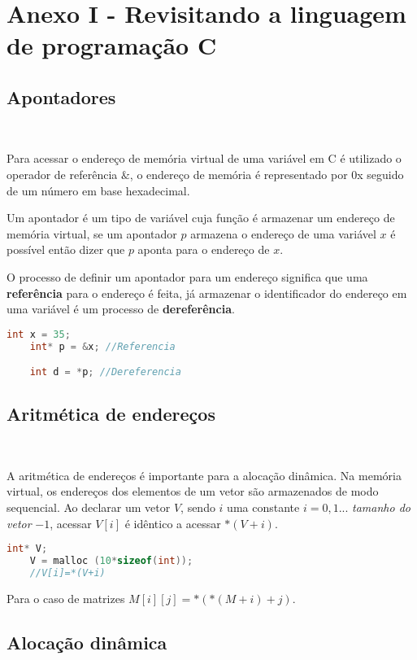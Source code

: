 \section*{Anexo I - Revisitando a linguagem de programação C}
\subsection*{Apontadores}
\

Para acessar o endereço de memória virtual de uma variável em C é utilizado o operador de referência $\&$, o endereço de memória é representado por 0x seguido de um número em base hexadecimal.

Um apontador é um tipo de variável cuja função é armazenar um endereço de memória virtual, se um apontador $p$ armazena o endereço de uma variável $x$ é possível então dizer que $p$ aponta para o endereço de $x$.

O processo de definir um apontador para um endereço significa que uma \textbf{referência} para o endereço é feita, já armazenar o identificador do endereço em uma variável é um processo de \textbf{dereferência}.

\begin{lstlisting}[language=C, frame=single]
    int x = 35;
    int* p = &x; //Referencia

    int d = *p; //Dereferencia
\end{lstlisting}

\subsection*{Aritmética de endereços}
\

A aritmética de endereços é importante para a alocação dinâmica. Na memória virtual, os endereços dos elementos de um vetor são armazenados de modo sequencial. Ao declarar um vetor $V$, sendo $i$ uma constante $i=0, 1 ...$ \textit{tamanho do vetor} $-1$, acessar $V[i]$ é idêntico a acessar $*(V+i)$.

\begin{lstlisting}[language=C, frame=single]
    int* V; 
    V = malloc (10*sizeof(int));
    //V[i]=*(V+i)
\end{lstlisting}

Para o caso de matrizes $M[i][j]=*(*(M+i)+j)$.

\subsection*{Alocação dinâmica}
\

